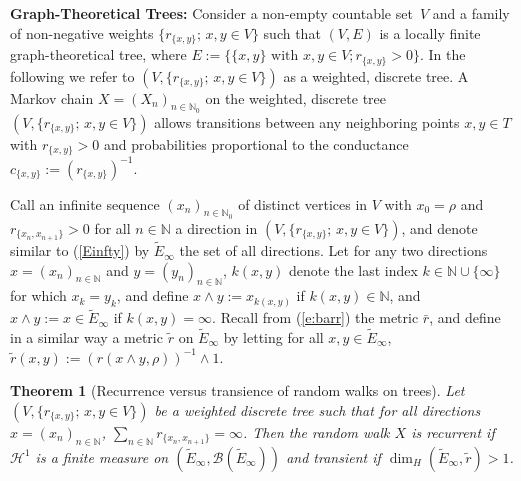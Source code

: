 \documentclass[11pt]{amsart}
\numberwithin{equation}{section}
\newtheorem{theorem}{Theorem}
\begin{document}
{ \medskip

{\bf Graph-Theoretical Trees:}
Consider a non-empty countable set~$V$ and a family of non-negative weights $\{r_{\{x,y\}};\,x,y\in V\}$ such that $(V,E)$ is a locally finite graph-theoretical tree, where $E:=\{\{x,y\}\mbox{ with }x,y\in V;r_{\{x,y\}}>0\}$. In the following we refer to $(V,\{r_{\{x,y\}};\,x,y\in V\})$ as a {{\it} weighted, discrete tree}. A Markov chain $X=(X_n)_{n\in{{\mathbb N}}_0}$ on the weighted, discrete tree $(V,\{r_{\{x,y\}};\,x,y\in V\})$
allows transitions between any neighboring points $x,y\in T$ with $r_{\{x,y\}}>0$ and probabilities proportional to the {{\it} conductance} $c_{\{x,y\}}:=(r_{\{x,y\}})^{-1}$.

Call an infinite sequence $(x_n)_{n\in{{\mathbb N}}_0}$ of distinct vertices in $V$ with $x_0=\rho$ and $r_{\{x_n,x_{n+1}\}}>0$ for all $n\in{{\mathbb N}}$ a {{\it} direction} in $(V,\{r_{\{x,y\}};\,x,y\in V\})$, and denote similar to (\ref{Einfty}) by $\tilde{E}_\infty$ the set of all directions. Let for any two directions $x=(x_n)_{n\in{{\mathbb N}}}$ and $y=(y_n)_{n\in{{\mathbb N}}}$,
$k(x,y)$ denote the last index $k\in{{\mathbb N}}\cup\{\infty\}$ for which $x_k=y_k$, and define
$x\wedge y:=x_{k(x,y)}$ if $k(x,y)\in\mathbb{N}$, and $x\wedge y:=x\in\tilde{E}_\infty$ if $k(x,y)=\infty$.
Recall from (\ref{e:barr}) the metric $\bar{r}$, and define in a similar way a metric $\tilde{r}$ on $\tilde{E}_\infty$ by letting for all $x,y\in\tilde{E}_\infty$, $\tilde{r}(x,y):=(r(x\wedge y,\rho))^{-1}\wedge 1$.

\begin{theorem}[Recurrence versus transience of random walks on trees]
Let $(V,\{r_{\{x,y\}};\,x,y\in V\})$ be a weighted discrete tree such that for all directions $x=(x_n)_{n\in{{\mathbb N}}}$, $\sum_{n\in{{\mathbb N}}}r_{\{x_n,x_{n+1}\}}=\infty$.
Then the random walk $X$ is recurrent if \label{nashwillconverse}
{${\mathcal H}^1$ is  a finite measure on $(\tilde{E}_\infty,{\mathcal B}(\tilde{E}_\infty))$} and
transient if $\dim_H(\tilde{E}_\infty,\tilde r)>1$.
\end{theorem}{\smallskip}

}
\end{document}
